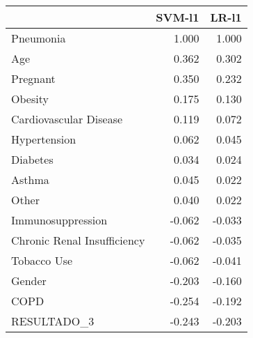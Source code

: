 \begin{tabular}{lrr}
\toprule
{} &  SVM-l1 &  LR-l1 \\
\midrule
Pneumonia                   &   1.000 &  1.000 \\
Age                         &   0.362 &  0.302 \\
Pregnant                    &   0.350 &  0.232 \\
Obesity                     &   0.175 &  0.130 \\
Cardiovascular Disease      &   0.119 &  0.072 \\
Hypertension                &   0.062 &  0.045 \\
Diabetes                    &   0.034 &  0.024 \\
Asthma                      &   0.045 &  0.022 \\
Other                       &   0.040 &  0.022 \\
Immunosuppression           &  -0.062 & -0.033 \\
Chronic Renal Insufficiency &  -0.062 & -0.035 \\
Tobacco Use                 &  -0.062 & -0.041 \\
Gender                      &  -0.203 & -0.160 \\
COPD                        &  -0.254 & -0.192 \\
RESULTADO\_3                 &  -0.243 & -0.203 \\
\bottomrule
\end{tabular}
